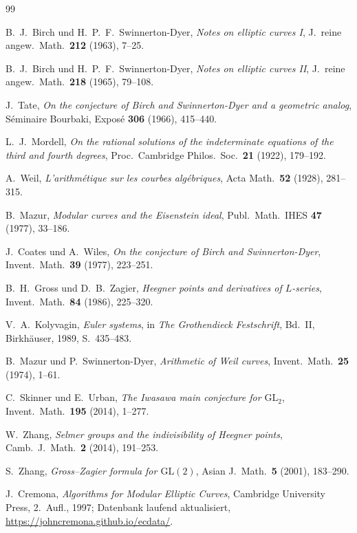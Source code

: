 \documentclass[12pt,a4paper]{article}
\theoremstyle{remark}
\begin{document}
\begin{thebibliography}{99}

B.~J.~Birch und H.~P.~F.~Swinnerton-Dyer,
\textit{Notes on elliptic curves I},
J.\ reine angew.\ Math.\ \textbf{212} (1963), 7--25.

B.~J.~Birch und H.~P.~F.~Swinnerton-Dyer,
\textit{Notes on elliptic curves II},
J.\ reine angew.\ Math.\ \textbf{218} (1965), 79--108.

J.~Tate,
\textit{On the conjecture of Birch and Swinnerton-Dyer and a geometric analog},
Séminaire Bourbaki, Exposé \textbf{306} (1966), 415--440.

L.~J.~Mordell,
\textit{On the rational solutions of the indeterminate equations of the third and fourth degrees},
Proc.\ Cambridge Philos.\ Soc.\ \textbf{21} (1922), 179--192.

A.~Weil,
\textit{L'arithmétique sur les courbes algébriques},
Acta Math.\ \textbf{52} (1928), 281--315.

B.~Mazur,
\textit{Modular curves and the Eisenstein ideal},
Publ.\ Math.\ IHES \textbf{47} (1977), 33--186.

J.~Coates und A.~Wiles,
\textit{On the conjecture of Birch and Swinnerton-Dyer},
Invent.\ Math.\ \textbf{39} (1977), 223--251.

B.~H.~Gross und D.~B.~Zagier,
\textit{Heegner points and derivatives of $L$-series},
Invent.\ Math.\ \textbf{84} (1986), 225--320.

V.~A.~Kolyvagin,
\textit{Euler systems},
in \textit{The Grothendieck Festschrift}, Bd.~II, Birkhäuser, 1989, S.~435--483.

B.~Mazur und P.~Swinnerton-Dyer,
\textit{Arithmetic of Weil curves},
Invent.\ Math.\ \textbf{25} (1974), 1--61.

C.~Skinner und E.~Urban,
\textit{The Iwasawa main conjecture for $\mathrm{GL}_2$},
Invent.\ Math.\ \textbf{195} (2014), 1--277.

W.~Zhang,
\textit{Selmer groups and the indivisibility of Heegner points},
Camb.\ J.\ Math.\ \textbf{2} (2014), 191--253.

S.~Zhang,
\textit{Gross--Zagier formula for $\mathrm{GL}(2)$},
Asian J.\ Math.\ \textbf{5} (2001), 183--290.

J.~Cremona,
\textit{Algorithms for Modular Elliptic Curves},
Cambridge University Press, 2.~Aufl., 1997; Datenbank laufend aktualisiert,
\url{https://johncremona.github.io/ecdata/}.


\end{thebibliography}
\end{document}
